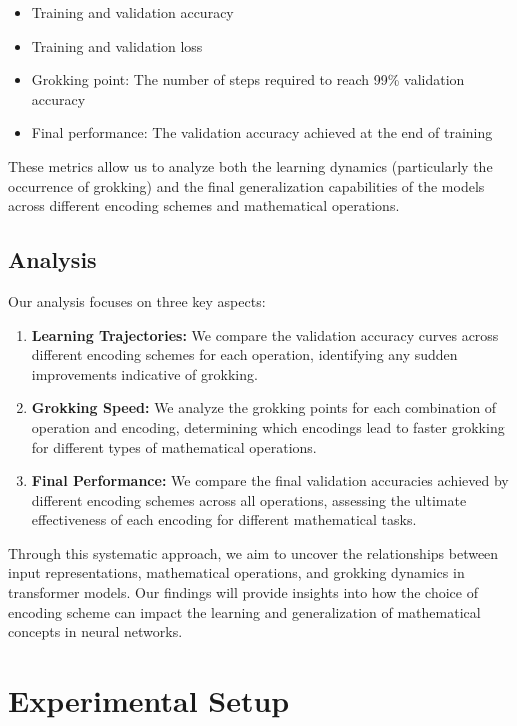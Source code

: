 \documentclass{article} %
\begin{document}
\begin{itemize}
    \item Training and validation accuracy
    \item Training and validation loss
    \item Grokking point: The number of steps required to reach 99\% validation accuracy
    \item Final performance: The validation accuracy achieved at the end of training
\end{itemize}

These metrics allow us to analyze both the learning dynamics (particularly the occurrence of grokking) and the final generalization capabilities of the models across different encoding schemes and mathematical operations.

\subsection{Analysis}
Our analysis focuses on three key aspects:

\begin{enumerate}
    \item \textbf{Learning Trajectories:} We compare the validation accuracy curves across different encoding schemes for each operation, identifying any sudden improvements indicative of grokking.
    
    \item \textbf{Grokking Speed:} We analyze the grokking points for each combination of operation and encoding, determining which encodings lead to faster grokking for different types of mathematical operations.
    
    \item \textbf{Final Performance:} We compare the final validation accuracies achieved by different encoding schemes across all operations, assessing the ultimate effectiveness of each encoding for different mathematical tasks.
\end{enumerate}

Through this systematic approach, we aim to uncover the relationships between input representations, mathematical operations, and grokking dynamics in transformer models. Our findings will provide insights into how the choice of encoding scheme can impact the learning and generalization of mathematical concepts in neural networks.

\section{Experimental Setup}
\label{sec:experimental}
\end{document}
